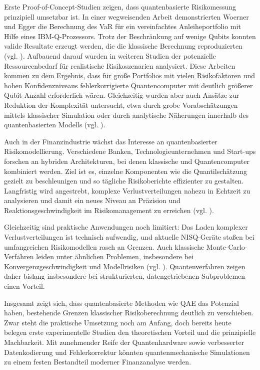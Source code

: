 Erste Proof-of-Concept-Studien zeigen, dass quantenbasierte Risikomessung prinzipiell umsetzbar ist. In einer wegweisenden Arbeit demonstrierten Woerner und Egger die Berechnung des VaR für ein vereinfachtes Anleiheportfolio mit Hilfe eines IBM-Q-Prozessors. Trotz der Beschränkung auf wenige Qubits konnten valide Resultate erzeugt werden, die die klassische Berechnung reproduzierten (vgl. \cite{egger_quantum_2020}). Aufbauend darauf wurden in weiteren Studien der potenzielle Ressourcenbedarf für realistische Risikoszenarien analysiert. Diese Arbeiten kommen zu dem Ergebnis, dass für große Portfolios mit vielen Risikofaktoren und hohen Konfidenzniveaus fehlerkorrigierte Quantencomputer mit deutlich größerer Qubit-Anzahl erforderlich wären. Gleichzeitig wurden aber auch Ansätze zur Reduktion der Komplexität untersucht, etwa durch grobe Vorabschätzungen mittels klassischer Simulation oder durch analytische Näherungen innerhalb des quantenbasierten Modells (vgl. \cite{martin_new_2025}).

Auch in der Finanzindustrie wächst das Interesse an quantenbasierter Risikomodellierung. Verschiedene Banken, Technologieunternehmen und Start-ups forschen an hybriden Architekturen, bei denen klassische und Quantencomputer kombiniert werden. Ziel ist es, einzelne Komponenten wie die Quantilschätzung gezielt zu beschleunigen und so tägliche Risikoberichte effizienter zu gestalten. Langfristig wird angestrebt, komplexe Verlustverteilungen nahezu in Echtzeit zu analysieren und damit ein neues Niveau an Präzision und Reaktionsgeschwindigkeit im Risikomanagement zu erreichen (vgl. \cite{orus_quantum_2019, bouland_prospects_2020}).

Gleichzeitig sind praktische Anwendungen noch limitiert: Das Laden komplexer Verlustverteilungen ist technisch aufwendig, und aktuelle NISQ-Geräte stoßen bei umfangreichen Risikomodellen rasch an Grenzen. Auch klassische Monte-Carlo-Verfahren leiden unter ähnlichen Problemen, insbesondere bei Konvergenzgeschwindigkeit und Modellrisiken (vgl. \cite{stamatopoulos_option_2020}). Quantenverfahren zeigen daher bislang insbesondere bei strukturierten, datengetriebenen Subproblemen einen Vorteil.

Insgesamt zeigt sich, dass quantenbasierte Methoden wie QAE das Potenzial haben, bestehende Grenzen klassischer Risikoberechnung deutlich zu verschieben. Zwar steht die praktische Umsetzung noch am Anfang, doch bereits heute belegen erste experimentelle Studien den theoretischen Vorteil und die prinzipielle Machbarkeit. Mit zunehmender Reife der Quantenhardware sowie verbesserter Datenkodierung und Fehlerkorrektur könnten quantenmechanische Simulationen zu einem festen Bestandteil moderner Finanzanalyse werden.


